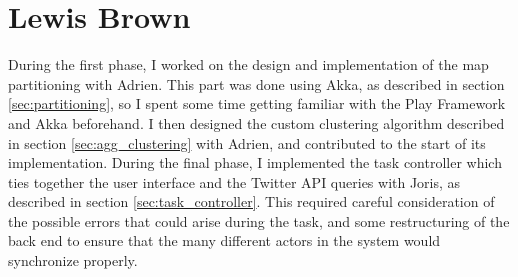 \section{Lewis Brown}

During the first phase, I worked on the design and implementation of the map
partitioning with Adrien.  This part was done using Akka, as described in
section \ref{sec:partitioning}, so I spent some time getting familiar with the
Play Framework and Akka beforehand.  I then designed the custom clustering
algorithm described in section \ref{sec:agg_clustering} with Adrien, and
contributed to the start of its implementation.  During the final phase, I
implemented the task controller which ties together the user interface and the
Twitter API queries with Joris, as described in section
\ref{sec:task_controller}.  This required careful consideration of the possible
errors that could arise during the task, and some restructuring of the back end
to ensure that the many different actors in the system would synchronize
properly.
